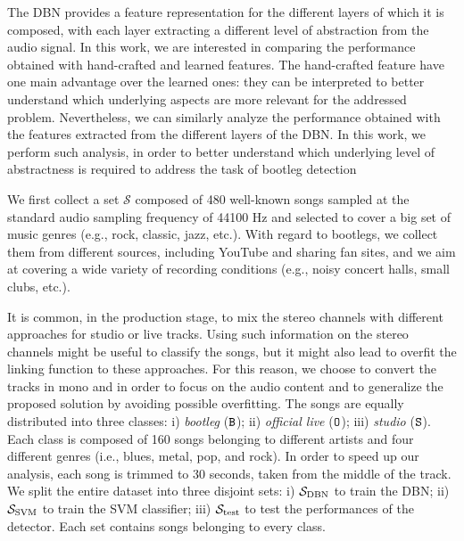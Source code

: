 The DBN provides a feature representation for the different layers of which it is composed, with each layer extracting a different level of abstraction from the audio signal. In this work, we are interested in comparing the performance obtained with hand-crafted and learned features. The hand-crafted feature have one main advantage over the learned ones: they can be interpreted to better understand which underlying aspects are more relevant for the addressed problem. Nevertheless, we can similarly analyze the performance obtained with the features extracted from the different layers of the DBN. In this work, we perform such analysis, in order to better understand which underlying level of abstractness is required to address the task of bootleg detection

We first collect a set $\mathcal{S}$ composed of 480 well-known songs sampled at the standard audio sampling frequency of 44100 Hz and selected to cover a big set of music genres (e.g., rock, classic, jazz, etc.). With regard to bootlegs, we collect them from different sources, including YouTube and sharing fan sites, and we aim at covering a wide variety of recording conditions (e.g., noisy concert halls, small clubs, etc.). 

It is common, in the production stage, to mix the stereo channels with different approaches for studio or live tracks. Using such information on the stereo channels might be useful to classify the songs, but it might also lead to overfit the linking function to these approaches. For this reason, we choose to convert the tracks in mono and in order to focus on the audio content and to generalize the proposed solution by avoiding possible overfitting.
The songs are equally distributed into three classes: i) \textit{bootleg} ($\B$); ii) \textit{official live} ($\O$); iii) \textit{studio} ($\S$). Each class is composed of 160 songs belonging to different artists and four different genres (i.e., blues, metal, pop, and rock). In order to speed up our analysis, each song is trimmed to 30 seconds, taken from the middle of the track. We split the entire dataset into three disjoint sets: i) $\Sdbn$ to train the DBN; ii) $\Ssvm$ to train the SVM classifier; iii) $\Stest$ to test the performances of the detector. Each set contains songs belonging to every class.

